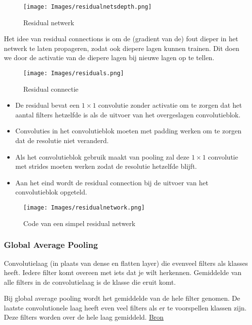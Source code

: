 {\begin{figure}[h!]
    \centering
    \texttt{[image: Images/residualnetsdepth.png]}
    \caption{Residual netwerk}
    \label{fig:filters}
\end{figure}

\noindent Het idee van residual connections is om de (gradient van de) fout dieper in het netwerk te laten propageren, zodat ook diepere lagen kunnen trainen. Dit doen we door de activatie van de diepere lagen bij nieuwe lagen op te tellen.

\begin{figure}[h!]
    \centering
    \texttt{[image: Images/residuals.png]}
    \caption{Residual connectie}
    \label{fig:filters}
\end{figure}
\begin{itemize}
    \item De residual bevat een $1\times 1$ convolutie zonder activatie om te zorgen dat het aantal filters hetzelfde is als de uitvoer van het overgeslagen convolutieblok.
    \item Convoluties in het convolutieblok moeten met padding werken om te zorgen dat de resolutie niet veranderd.
    \item Als het convolutieblok gebruik maakt van pooling zal deze $1\times 1$ convolutie met strides moeten werken zodat de resolutie hetzelfde blijft.
    \item Aan het eind wordt de residual connection bij de uitvoer van het convolutieblok opgeteld.
\end{itemize}

\begin{figure}[h!]
    \centering
    \texttt{[image: Images/residualnetwork.png]}
    \caption{Code van een simpel residual netwerk}
    \label{fig:filters}
\end{figure}
\newpage
\subsubsection{Global Average Pooling}
Convolutielaag (in plaats van dense en flatten layer) die evenveel filters als klasses heeft. Iedere filter komt overeen met iets dat je wilt herkennen. Gemiddelde van alle filters in de convolutielaag is de klasse die eruit komt. 

\noindent Bij global average pooling wordt het gemiddelde van de hele filter genomen. De laatste convolutionele laag heeft even veel filters als er te voorspellen klassen zijn. Deze filters worden over de hele laag gemiddeld. \href{https://arxiv.org/pdf/1312.4400.pdf}{Bron}

}
